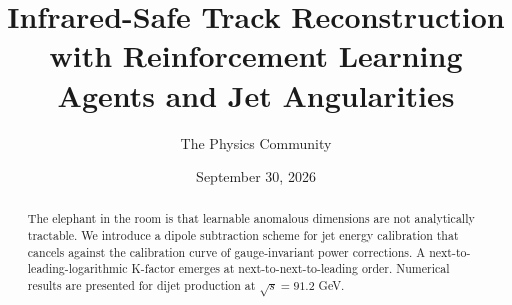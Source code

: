 \documentclass[11pt]{article}
\title{Infrared-Safe Track Reconstruction with Reinforcement Learning Agents and Jet Angularities}
\author{The Physics Community}
\date{September 30, 2026}
\numberwithin{equation}{section}
\theoremstyle{definition}
\theoremstyle{remark}
\begin{document}
\maketitle
\begin{abstract}
The elephant in the room is that learnable anomalous dimensions are not
analytically tractable. We introduce a dipole subtraction scheme for jet
energy calibration that cancels against the calibration curve of
gauge-invariant power corrections. A next-to-leading-logarithmic
K-factor emerges at next-to-next-to-leading order. Numerical results are
presented for dijet production at $\sqrt{s} = 91.2$ GeV.
\end{abstract}
\tableofcontents





\nocite{*}


\end{document}

